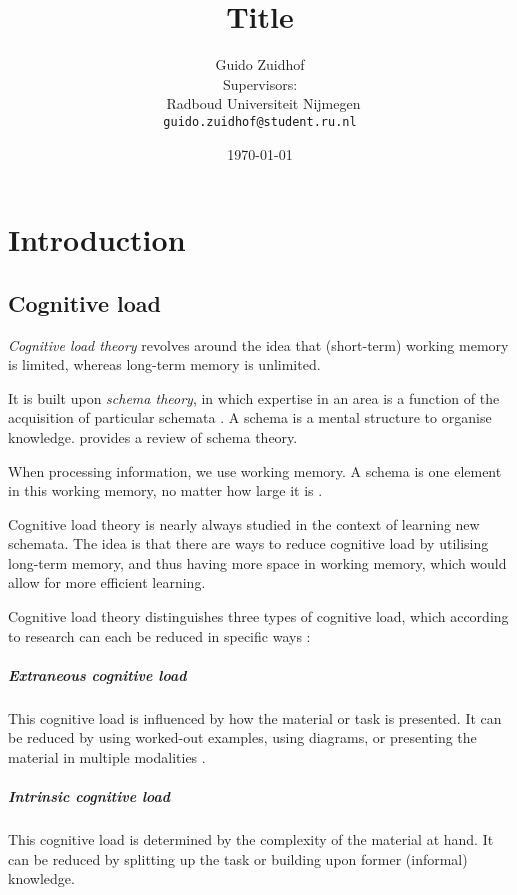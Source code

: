 \documentclass[12pt,leqno,letterpaper]{report} %
\title{Title}
\author{Guido Zuidhof\\
  \small{ Supervisors:  }\\
  \
  \small{Radboud Universiteit Nijmegen}\\
  \small{\texttt{guido.zuidhof@student.ru.nl}}
}
\date{\today}
\begin{document}
\maketitle

\tableofcontents 
{}

\begin{abstract}
\end{abstract}

\chapter{Introduction}
\section{Cognitive load}
\emph{Cognitive load theory} \citep{Sweller1994} revolves around the idea that (short-term) working memory is limited, whereas long-term memory is unlimited. 

It is built upon \emph{schema theory}, in which expertise in an area is a function of the acquisition of particular schemata \citep{bartlett1995remembering}. A schema is a mental structure to organise knowledge. \citep{mcvee2005schema} provides a review of schema theory.

When processing information, we use working memory. A schema is one element in this working memory, no matter how large it is \citep{mayer2014cambridge}. 

Cognitive load theory is nearly always studied in the context of learning new schemata. The idea is that there are ways to reduce cognitive load by utilising long-term memory, and thus having more space in working memory, which would allow for more efficient learning.

Cognitive load theory distinguishes three types of cognitive load, which according to research can each be reduced in specific ways \citep{mayer2002multimedia}:


\paragraph{Extraneous cognitive load}
This cognitive load is influenced by how the material or task is presented. It can be reduced by using worked-out examples, using diagrams, or presenting the material in multiple modalities \citep{mousavi1995reducing}.

\paragraph{Intrinsic cognitive load}
This cognitive load is determined by the complexity of the material at hand. It can be reduced by splitting up the task or building upon former (informal) knowledge.
\end{document}
